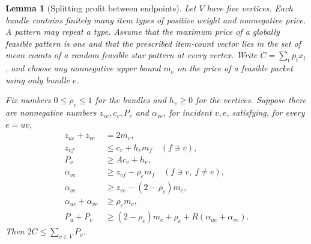 \documentclass[11pt]{article}
\newtheorem{lemma}[theorem]{Lemma}
\theoremstyle{definition}\newtheorem{algorithm}{Algorithm}[section]
\numberwithin{equation}{section}
\theoremstyle{remark}\newtheorem*{remark}{Remark}
\begin{document}
\begin{lemma}[Splitting profit between endpoints]
\label{lem:subtwo-endpoint-potential}
Let $V$ have five vertices. Each bundle contains finitely many item
types of positive weight and nonnegative price. A pattern may repeat
a type. Assume that the maximum price of a globally feasible pattern
is one and that the prescribed item-count vector lies in the
set of mean counts of a random feasible star pattern at every vertex. Write
$C=\sum_t p_tx_t$, and choose any nonnegative upper bound $m_e$ on
the price of a feasible packet using only bundle $e$.

Fix numbers $0\le\rho_e\le1$ for the bundles and $h_v\ge0$ for the
vertices. Suppose there are nonnegative numbers $z_{ve},c_v,P_v$
and $\alpha_{ve}$, for incident $v,e$, satisfying, for every
$e=uv$,
\begin{align}
 z_{ue}+z_{ve}&=2m_e,                                      \label{eq:subtwo-pot-sum}\\
 z_{vf}&\le c_v+h_vm_f\quad(f\ni v),                     \label{eq:subtwo-pot-light}\\
 P_v&\ge Ac_v+h_v,                                        \label{eq:subtwo-pot-base}\\
 \alpha_{ve}&\ge z_{vf}-\rho_em_f\quad(f\ni v,\ f\ne e), \label{eq:subtwo-pot-off}\\
 \alpha_{ve}&\ge z_{ve}-(2-\rho_e)m_e,                     \label{eq:subtwo-pot-one}\\
 \alpha_{ue}+\alpha_{ve}&\ge\rho_em_e,                    \label{eq:subtwo-pot-two}\\
 P_u+P_v&\ge(2-\rho_e)m_e+\rho_e
                     +R(\alpha_{ue}+\alpha_{ve}).          \label{eq:subtwo-pot-edge}
\end{align}
Then $2C\le\sum_{v\in V}P_v$.
\end{lemma}
\end{document}
